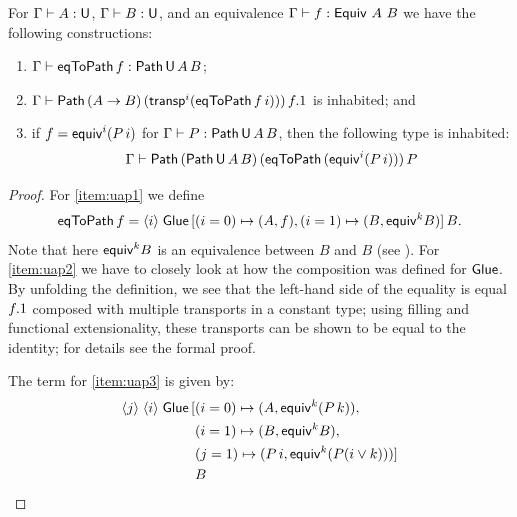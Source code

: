 \begin{lemma}
  \label{lem:ua-prel}
  For $\Gamma \vdash A : \mathsf{U}$, $\Gamma \vdash B : \mathsf{U}$, and an
  equivalence $\Gamma \vdash f : {\sf Equiv}~A~B$ we have the following
  constructions:
  \begin{enumerate}
  \item\label{item:uap1} $\Gamma \vdash \operatorname{\mathsf{eqToPath}} f :
    {\sf Path}\, \mathsf{U}\, A\, B$;
  \item\label{item:uap2} $\Gamma \vdash {\sf Path} \, (A \to B) \,
    (\operatorname{\mathsf{transp}}^i (\operatorname{\mathsf{eqToPath}} f \, i))) \, f.1$ is
    inhabited; and
  \item\label{item:uap3} if $f = {\sf equiv}^i (P \, i)$ for $\Gamma
    \vdash P : {\sf Path} \, \mathsf{U}\, A \, B$, then the following type is
    inhabited:
    \[
    \Gamma \vdash %
    \Path \, (\Path \, \U \, A \, B) \, (\eqToPath {(\eq^i (P \, i))})
    \, P
    \]
  \end{enumerate}
\end{lemma}
\begin{proof}
  For \eqref{item:uap1} we define
  \begin{align}
    \label{eq:def-eqToPath}
    \operatorname{\mathsf{eqToPath}} f = {\langle}i{\rangle} \; {{\sf Glue} \, [ (i=0) \mapsto
      (A,f), (i=1) \mapsto (B, {\sf equiv}^k B)] \, B }.
  \end{align}
  Note that here ${\sf equiv}^k B$ is an equivalence between $B$ and $B$ (see
  ). For \eqref{item:uap2} we have to closely look
  at how the composition was defined for ${\sf Glue}$. By unfolding the
  definition, we see that the left-hand side of the equality is equal
  $f.1$ composed with multiple transports in a constant type;
  using filling and functional extensionality, these transports can be
  shown to be equal to the identity; for details see the formal proof.

  The term for \eqref{item:uap3} is given by:
  \begin{align*}
    \pabs {j} \pabs {i} \Glue \,[ %
    &(i=0) \mapsto (A, \eq^k (P\, k)),\\
    &(i=1) \mapsto (B, \eq^k B),\\
    &(j=1) \mapsto (P \, i, \eq^k (P (i \lor k)))]\\
    &B \qedhere
  \end{align*}
\end{proof}

